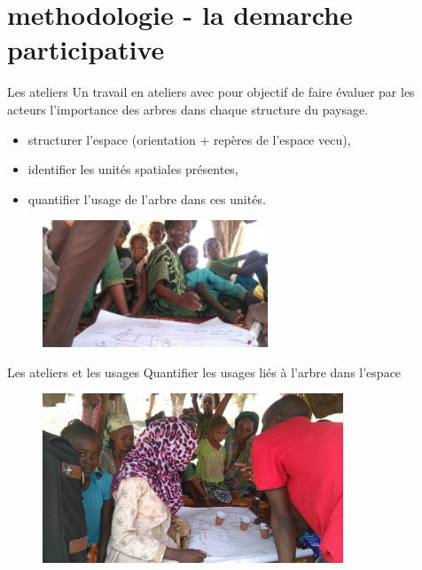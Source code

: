 \documentclass[newPxFont]{beamer}
\begin{document}
\section{methodologie - la demarche participative}
\begin{frame}[c]{Les ateliers}
\vspace{-1cm}
Un travail en ateliers avec pour objectif de faire évaluer par les acteurs l'importance des arbres dans chaque structure du paysage.
\begin{itemize}
  \item structurer l'espace (orientation + repères de l'espace vecu),
  \item identifier les unités spatiales présentes,
  \item quantifier l'usage de l'arbre dans ces unités.
\end{itemize}
\begin{figure}
	\centering
	\includegraphics[width = 0.6\textwidth,angle=180]{img/DSC_1789}
\end{figure}
\end{frame}



\begin{frame}[c]{Les ateliers et les usages}
\vspace{-1cm}
Quantifier les usages liés à l'arbre dans l'espace
\begin{figure}
  \centering
  \includegraphics[width = 0.8\textwidth]{img/DSC_1793}
\end{figure}

\end{frame}
\end{document}
